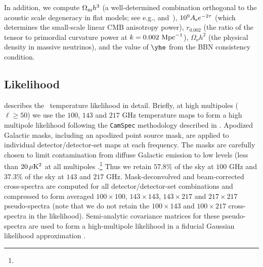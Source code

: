In addition, we compute
$\Omega_{\rm m}h^3$ (a well-determined combination orthogonal to the acoustic
scale degeneracy in flat models; see e.g., \citealt{Percival:2002gq} and~\citealt{Howlett:2012mh}),
$10^9 A_{\rm s} e^{-2\tau}$ (which determines the small-scale linear
CMB anisotropy power),
$r_{0.002}$ (the ratio of the tensor to primordial curvature
power at $k = 0.002 \ {\rm Mpc}^{-1}$),
$\Omega_\nu h^2$ (the physical density in massive neutrinos), and the value of $\yhe$ from the BBN consistency condition.


\subsection{Likelihood}
\label{subsec:likelihood}

\cite{planck2013-p08} describes the \Planck\ temperature likelihood in
detail.  Briefly, at high multipoles ($\ell \ge 50$) we use the $100$,
$143$ and $217$ GHz temperature maps
\citep[constructed using {\tt HEALPix}][]{gorski2005} to form a high multipole
likelihood following the {\tt CamSpec} methodology described in
\cite{planck2013-p08}. Apodized Galactic masks, including an apodized
point source mask, are applied to individual detector/detector-set
maps at each frequency. The masks are carefully chosen to limit
contamination from diffuse Galactic emission to low levels (less than
$20\, \mu{\rm K}^2$ at all multipoles .\footnote{}
Thus we retain $57.8\%$ of
the sky at $100$ GHz and $37.3\%$ of the sky at $143$ and $217$
GHz. Mask-deconvolved and beam-corrected cross-spectra
\citep[following][]{Hietal02} are computed
for all detector/detector-set combinations and compressed to form
averaged $100\times100$, $143\times143$, $143\times217$ and
$217\times217$ pseudo-spectra (note that we do not retain the
$100\times143$ and $100\times 217$ cross-spectra in the likelihood).
Semi-analytic covariance matrices for these pseudo-spectra
\citep{Efstathiou:04} are used to form a high-multipole likelihood in
a fiducial Gaussian likelihood approximation
\citep{DABJK00,2008PhRvD..77j3013H}.

